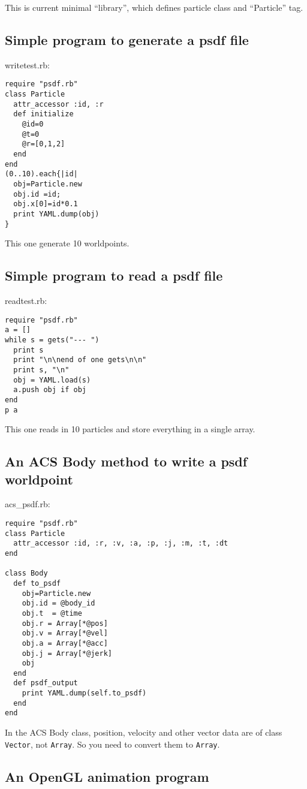 \documentclass{elsart5p}
\begin{document}
This is current minimal ``library'', which defines particle class and
``Particle'' tag.

\subsection{Simple program to generate a psdf file}

writetest.rb:
\begin{verbatim}
require "psdf.rb"
class Particle
  attr_accessor :id, :r   
  def initialize
    @id=0
    @t=0
    @r=[0,1,2]
  end
end
(0..10).each{|id|
  obj=Particle.new
  obj.id =id;
  obj.x[0]=id*0.1
  print YAML.dump(obj)
}
\end{verbatim}

This one generate 10 worldpoints.

\subsection{Simple program to read a psdf file}

readtest.rb:
\begin{verbatim}
require "psdf.rb"
a = []
while s = gets("--- ")
  print s
  print "\n\nend of one gets\n\n"
  print s, "\n"
  obj = YAML.load(s) 
  a.push obj if obj
end
p a
\end{verbatim}

This one reads in 10 particles and store everything in a single array.

\subsection{An ACS Body method to write a psdf worldpoint}

acs\_psdf.rb:
\begin{verbatim}
require "psdf.rb"
class Particle
  attr_accessor :id, :r, :v, :a, :p, :j, :m, :t, :dt
end

class Body
  def to_psdf
    obj=Particle.new
    obj.id = @body_id
    obj.t  = @time
    obj.r = Array[*@pos]
    obj.v = Array[*@vel]
    obj.a = Array[*@acc]
    obj.j = Array[*@jerk]
    obj
  end
  def psdf_output
    print YAML.dump(self.to_psdf)
  end
end
\end{verbatim}

In the ACS Body class, position, velocity and other vector data are of
class {\tt Vector}, not {\tt Array}. So you need to convert them to
{\tt Array}.

\subsection{An OpenGL animation program}
\end{document}
